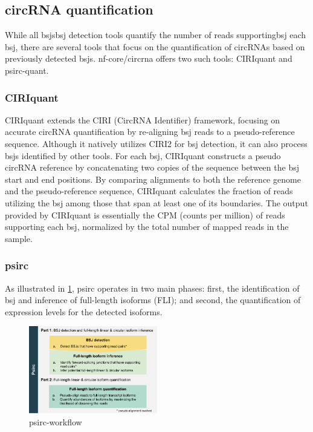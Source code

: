 \subsection{circRNA quantification}

While all \gls{bsj}s{bsj} detection tools quantify the number of reads
supporting\gls{bsj} each \gls{bsj}, there are several tools that focus on the
quantification of circRNAs based on previously detected \gls{bsj}s.
nf-core/circrna offers two such tools: CIRIquant and
psirc-quant.

\subsubsection{CIRIquant}
\label{sec:ciriquant}
CIRIquant extends the CIRI (CircRNA Identifier) framework, focusing on accurate
circRNA quantification by re-aligning \gls{bsj} reads to a pseudo-reference
sequence.
Although it natively utilizes CIRI2 for \gls{bsj} detection, it can also
process \gls{bsj}s identified by other tools\supercite{zhang_accurate_2020}.
For each \gls{bsj}, CIRIquant constructs a pseudo circRNA reference by
concatenating two copies of the sequence between the \gls{bsj} start and end
positions.
By comparing alignments to both the reference genome and the pseudo-reference
sequence, CIRIquant calculates the fraction of reads utilizing the \gls{bsj}
among those that span at least one of its
boundaries\supercite{zhang_accurate_2020}.
The output provided by CIRIquant is essentially the CPM (counts per million) of
reads supporting each \gls{bsj}, normalized by the total number of mapped reads
in the sample.

\subsubsection{psirc}
\label{sec:psirc}
As illustrated in \cref{fig:psirc_workflow}, psirc operates in two main phases:
first, the identification of \gls{bsj} and inference of full-length isoforms
(FLI); and second, the quantification of expression levels for the detected
isoforms\supercite{yu_quantifying_2021}.

\begin{figure}[ht] \centering

    \includegraphics[width=0.5\textwidth]{chapters/3_materials_and_methods/figures/psirc_pipeline.png}
    \caption{psirc-workflow} \label{fig:psirc_workflow} \end{figure}

